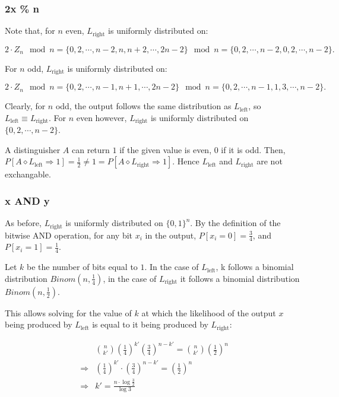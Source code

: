 \documentclass[a4paper]{scrreprt}
\begin{document}
\subsubsection{2x \% n}

Note that, for $n$ even, $L_{\text{right}}$ is uniformly distributed on:

\[
	2 \cdot Z_n \mod n = \{0, 2, \cdots, n - 2, n, n + 2, \cdots, 2n - 2\} \mod n = \{0, 2, \cdots, n - 2, 0, 2, \cdots, n - 2\}.
\]

For $n$ odd, $L_{\text{right}}$ is uniformly distributed on:

\[
	2 \cdot Z_n \mod n = \{0, 2, \cdots, n - 1, n + 1, \cdots, 2n - 2\} \mod n = \{0, 2, \cdots, n - 1, 1, 3, \cdots, n - 2\}.
\]

Clearly, for $n$ odd, the output follows the same distribution as
$L_{\text{left}}$, so $L_{\text{left}} \equiv L_{\text{right}}$. For $n$ even
however, $L_{\text{right}}$ is uniformly distributed on $\{0, 2, \cdots,
n-2\}$.

A distinguisher $A$ can return $1$ if the given value is even, $0$ if it is
odd. Then, $P[A \diamond L_{\text{left}} \Rightarrow 1] = \frac{1}{2} \neq 1 =
P[A \diamond L_{\text{right}} \Rightarrow 1]$. Hence $L_{\text{left}}$ and
$L_{\text{right}}$ are not exchangable.

\subsubsection{x AND y}

As before, $L_{\text{right}}$ is uniformly distributed on $\{0, 1\}^n$. By the
definition of the bitwise AND operation, for any bit $x_i$ in the output,
$P[x_i = 0] = \frac{3}{4}$, and $P[x_i = 1] = \frac{1}{4}$.

Let $k$ be the number of bits equal to $1$. In the case of $L_{\text{left}}$, k
follows a binomial distribution $Binom(n, \frac{1}{4})$, in the case of
$L_{\text{right}}$ it follows a binomial distribution $Binom(n, \frac{1}{2})$.

This allows solving for the value of $k$ at which the likelihood of the output
$x$ being produced by $L_{\text{left}}$ is equal to it being produced by
$L_{\text{right}}$:

\begin{align*}
	& \binom{n}{k'} \left(\frac{1}{4}\right)^{k'} \left(\frac{3}{4}\right)^{n - k'} = \binom{n}{k'} \left(\frac{1}{2}\right)^n \\
	\Rightarrow & \left(\frac{1}{4}\right)^{k'} \cdot \left(\frac{3}{4}\right)^{n - k'} = \left(\frac{1}{2}\right)^n \\
	\Rightarrow & k' = \frac{n \cdot \log{\frac{3}{2}}}{\log{3}}
\end{align*}
\end{document}

